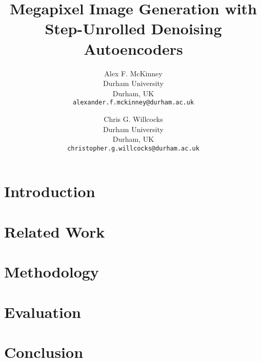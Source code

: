 \documentclass[10pt,twocolumn,letterpaper]{article}
\begin{document}
\title{Megapixel Image Generation with Step-Unrolled Denoising Autoencoders}

\author{Alex F. McKinney\\
Durham University\\
Durham, UK\\
{\tt\small alexander.f.mckinney@durham.ac.uk}
\and
Chris G. Willcocks\\
Durham University\\
Durham, UK\\
{\tt\small christopher.g.willcocks@durham.ac.uk}
}
\maketitle

\begin{abstract}
    
\end{abstract}

\section{Introduction}
\label{sec:intro}


\section{Related Work}
\label{sec:related}


\section{Methodology}
\label{sec:method}


\section{Evaluation}
\label{sec:evaluation}


\section{Conclusion}
\label{sec:conclusion}


{\small


}
\end{document}
